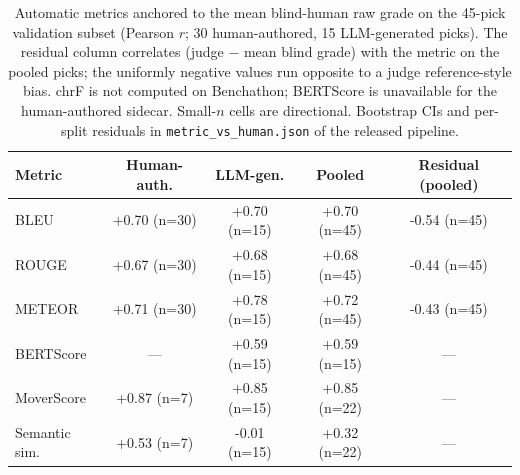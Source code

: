 \begin{table}[t]
\centering\footnotesize
\caption{Automatic metrics anchored to the mean blind-human raw grade on the 45-pick validation subset (Pearson $r$; 30 human-authored, 15 LLM-generated picks). The residual column correlates (judge $-$ mean blind grade) with the metric on the pooled picks; the uniformly negative values run opposite to a judge reference-style bias. chrF is not computed on Benchathon; BERTScore is unavailable for the human-authored sidecar. Small-$n$ cells are directional. Bootstrap CIs and per-split residuals in \texttt{metric\_vs\_human.json} of the released pipeline.}
\label{tbl-metric-vs-human}
\setlength{\tabcolsep}{4pt}
\begin{tabular*}{\textwidth}{@{\extracolsep{\fill}}lcccc@{}}
\toprule
Metric & Human-auth. & LLM-gen. & Pooled & Residual (pooled) \\
\midrule
BLEU & +0.70 {\scriptsize (n=30)} & +0.70 {\scriptsize (n=15)} & +0.70 {\scriptsize (n=45)} & -0.54 {\scriptsize (n=45)} \\
ROUGE & +0.67 {\scriptsize (n=30)} & +0.68 {\scriptsize (n=15)} & +0.68 {\scriptsize (n=45)} & -0.44 {\scriptsize (n=45)} \\
METEOR & +0.71 {\scriptsize (n=30)} & +0.78 {\scriptsize (n=15)} & +0.72 {\scriptsize (n=45)} & -0.43 {\scriptsize (n=45)} \\
BERTScore & — & +0.59 {\scriptsize (n=15)} & +0.59 {\scriptsize (n=15)} & — \\
MoverScore & +0.87 {\scriptsize (n=7)} & +0.85 {\scriptsize (n=15)} & +0.85 {\scriptsize (n=22)} & — \\
Semantic sim. & +0.53 {\scriptsize (n=7)} & -0.01 {\scriptsize (n=15)} & +0.32 {\scriptsize (n=22)} & — \\
\bottomrule
\end{tabular*}
\end{table}
